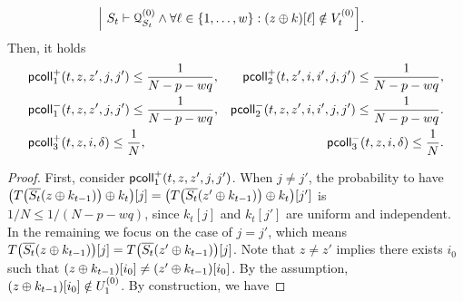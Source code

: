 \begin{lemma}
\begin{align*}
	&~\Big|~S_t\vdash\mathcal{Q}_{S_t}^{(0)}\wedge\forall\ell\in\{1,\ldots,w\}:(z\oplus k)[\ell]\notin V_t^{(0)}\Big].
	\end{align*}
	Then, it holds
	\begin{align}
	&\mathsf{pcoll}_{1}^+(t,z,z',j,j')\leq\frac{1}{N-p-wq},  &\mathsf{pcoll}_{2}^+(t,z',i,i',j,j')\leq\frac{1}{N-p-wq},    \notag    \\
	&\mathsf{pcoll}_{1}^-(t,z,z',j,j')\leq\frac{1}{N-p-wq},  &\mathsf{pcoll}_{2}^-(t,z,z',i,i',j,j')\leq\frac{1}{N-p-wq}.    \notag   \\
	&\mathsf{pcoll}_{3}^+(t,z,i,\delta)\leq\frac{1}{N}, 
	&\mathsf{pcoll}_{3}^-(t,z,i,\delta)\leq\frac{1}{N}.    \notag
	\end{align}
\end{lemma}
\begin{proof}
	First, consider $\mathsf{pcoll}_{1}^+(t,z,z',j,j')$. When $j\neq j'$, the probability to have
	$\big(T\big(\overline{S_t}(z\oplus k_{t-1})\big)\oplus k_t\big)[j]=\big(T\big(\overline{S_t}(z'\oplus k_{t-1})\big)\oplus k_t\big)[j']$ is $1/N\leq 1/(N-p-wq)$, since $k_t[j]$ and $k_t[j']$ are uniform and independent. In the remaining we focus on the case of $j=j'$, which means $T\big(\overline{S_t}(z\oplus k_{t-1})\big)[j]=T\big(\overline{S_t}(z'\oplus k_{t-1})\big)[j]$. Note that $z\neq z'$ implies there exists $i_0$ such that $(z\oplus k_{t-1})[i_0]\neq(z'\oplus k_{t-1})[i_0]$. By the assumption, $(z\oplus k_{t-1})[i_0]\notin U_1^{(0)}$. By construction, we have

\end{proof}
